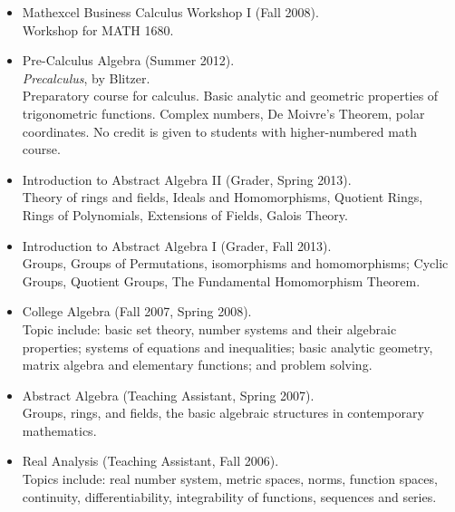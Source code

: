 \documentclass[11pt]{article}
\begin{document}
\begin{itemize}
  \item{}
    Mathexcel Business Calculus Workshop I (Fall 2008).\\
    Workshop for MATH 1680.

  \newpage

  \item{}
    Pre-Calculus Algebra (Summer 2012).\\
    \emph{Precalculus}, by Blitzer.\\
    Preparatory course for calculus. Basic analytic and geometric
    properties of trigonometric functions. Complex numbers, De Moivre's
    Theorem, polar coordinates. No credit is given to students with
    higher-numbered math course.

  \item{}
    Introduction to Abstract Algebra II (Grader, Spring 2013).\\
    Theory of rings and fields, Ideals and Homomorphisms, Quotient
    Rings, Rings of Polynomials, Extensions of Fields, Galois Theory.

  \item{}
    Introduction to Abstract Algebra I (Grader, Fall 2013).\\
    Groups, Groups of Permutations, isomorphisms and homomorphisms;
    Cyclic Groups, Quotient Groups, The Fundamental Homomorphism Theorem.

\end{itemize}




\begin{itemize}
  \item{}
    College Algebra (Fall 2007, Spring 2008).\\
    Topic include: basic set theory, number systems and their algebraic
    properties; systems of equations and inequalities; basic analytic
    geometry, matrix algebra and elementary functions; and problem
    solving.

  \item{}
    Abstract Algebra (Teaching Assistant, Spring 2007).\\
    Groups, rings, and fields, the basic algebraic structures in
    contemporary mathematics.

  \item{}
    Real Analysis (Teaching Assistant, Fall 2006).\\
    Topics include: real number system, metric spaces, norms, function
    spaces, continuity, differentiability, integrability of functions,
    sequences and series.

\end{itemize}


\label{page:last}
\end{document}
